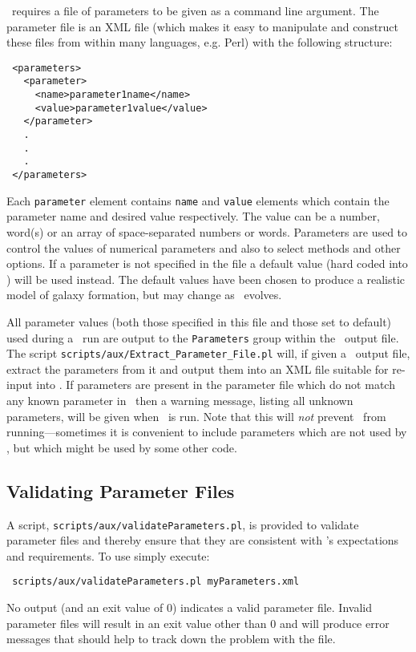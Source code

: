 \glc\ requires a file of parameters to be given as a command line argument. The parameter file is an XML file (which makes it easy to manipulate and construct these files from within many languages, e.g. Perl) with the following structure:
\begin{verbatim}
 <parameters>
   <parameter>
     <name>parameter1name</name>
     <value>parameter1value</value>
   </parameter>
   .
   .
   .
 </parameters>
\end{verbatim}
Each {\tt parameter} element contains {\tt name} and {\tt value} elements which contain the parameter name and desired value respectively. The value can be a number, word(s) or an array of space-separated numbers or words. Parameters are used to control the values of numerical parameters and also to select methods and other options. If a parameter is not specified in the file a default value (hard coded into \glc) will be used instead. The default values have been chosen to produce a realistic model of galaxy formation, but may change as \glc\ evolves.

All parameter values (both those specified in this file and those set to default) used during a \glc\ run are output to the {\tt Parameters} group within the \glc\ output file. The script {\tt scripts/aux/Extract\_Parameter\_File.pl} will, if given a \glc\ output file, extract the parameters from it and output them into an XML file suitable for re-input into \glc. If parameters are present in the parameter file which do not match any known parameter in \glc\ then a warning message, listing all unknown parameters, will be given when \glc\ is run. Note that this will \emph{not} prevent \glc\ from running---sometimes it is convenient to include parameters which are not used by \glc, but which might be used by some other code.

\subsection{Validating Parameter Files}

A script, {\tt scripts/aux/validateParameters.pl}, is provided to validate parameter files and thereby ensure that they are consistent with \glc's expectations and requirements. To use simply execute:
\begin{verbatim}
 scripts/aux/validateParameters.pl myParameters.xml
\end{verbatim}
No output (and an exit value of 0) indicates a valid parameter file. Invalid parameter files will result in an exit value other than 0 and will produce error messages that should help to track down the problem with the file.

